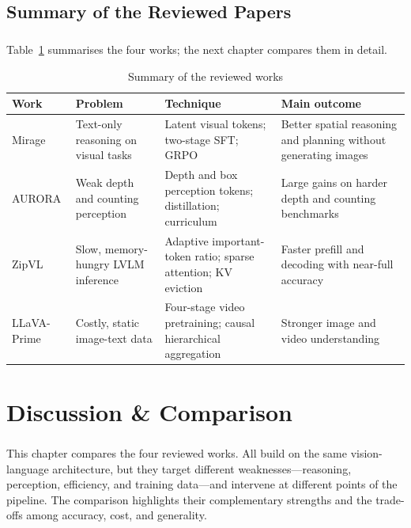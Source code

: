 \documentclass[12pt,a4paper,final]{extreport}
\begin{document}
\section{Summary of the Reviewed Papers}

\paragraph{} Table~\ref{tab:summary} summarises the four works; the next chapter compares them in detail.

{\renewcommand{\arraystretch}{1.15}
\begin{table}[htbp]
\centering
\caption{Summary of the reviewed works}\label{tab:summary}
\small
\begin{tabularx}{\textwidth}{|p{2.1cm}|p{2.4cm}|X|X|}
\hline
\textbf{Work} & \textbf{Problem} & \textbf{Technique} & \textbf{Main outcome} \\ \hline
Mirage \cite{p1} & Text-only reasoning on visual tasks & Latent visual tokens; two-stage SFT; GRPO & Better spatial reasoning and planning without generating images \\ \hline
AURORA \cite{p2} & Weak depth and counting perception & Depth and box perception tokens; distillation; curriculum & Large gains on harder depth and counting benchmarks \\ \hline
ZipVL \cite{p3} & Slow, memory-hungry LVLM inference & Adaptive important-token ratio; sparse attention; KV eviction & Faster prefill and decoding with near-full accuracy \\ \hline
LLaVA-Prime \cite{p4} & Costly, static image-text data & Four-stage video pretraining; causal hierarchical aggregation & Stronger image and video understanding \\ \hline
\end{tabularx}
\end{table}}

\chapter{Discussion \& Comparison}

\paragraph{} This chapter compares the four reviewed works. All build on the same vision-language architecture, but they target different weaknesses---reasoning, perception, efficiency, and training data---and intervene at different points of the pipeline. The comparison highlights their complementary strengths and the trade-offs among accuracy, cost, and generality.
\end{document}
